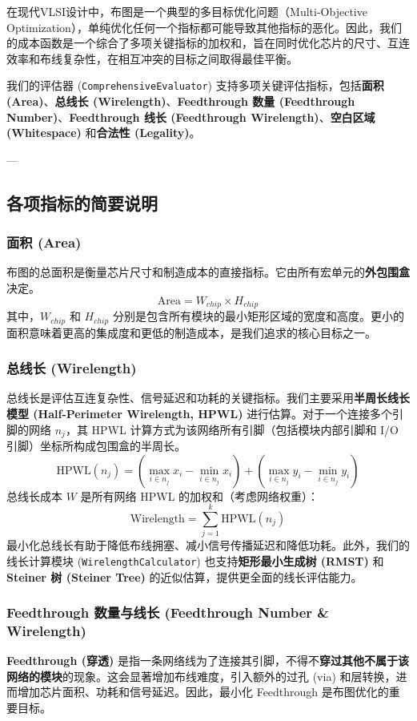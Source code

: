 \documentclass[conference]{IEEEtran}
\begin{document}
在现代VLSI设计中，布图是一个典型的多目标优化问题（Multi-Objective Optimization），单纯优化任何一个指标都可能导致其他指标的恶化。因此，我们的成本函数是一个综合了多项关键指标的加权和，旨在同时优化芯片的尺寸、互连效率和布线复杂性，在相互冲突的目标之间取得最佳平衡。

我们的评估器 (\texttt{ComprehensiveEvaluator}) 支持多项关键评估指标，包括\textbf{面积 (Area)}、\textbf{总线长 (Wirelength)}、\textbf{Feedthrough 数量 (Feedthrough Number)}、\textbf{Feedthrough 线长 (Feedthrough Wirelength)}、\textbf{空白区域 (Whitespace)} 和\textbf{合法性 (Legality)}。

---

\subsection{各项指标的简要说明}

\subsubsection{面积 (Area)}
布图的总面积是衡量芯片尺寸和制造成本的直接指标。它由所有宏单元的\textbf{外包围盒}决定。
$$ \text{Area} = W_{chip} \times H_{chip} $$
其中，$W_{chip}$ 和 $H_{chip}$ 分别是包含所有模块的最小矩形区域的宽度和高度。更小的面积意味着更高的集成度和更低的制造成本，是我们追求的核心目标之一。

\subsubsection{总线长 (Wirelength)}
总线长是评估互连复杂性、信号延迟和功耗的关键指标。我们主要采用\textbf{半周长线长模型 (Half-Perimeter Wirelength, HPWL)} \cite{B.A.-47}进行估算。对于一个连接多个引脚的网络 $n_j$，其 HPWL 计算方式为该网络所有引脚（包括模块内部引脚和 I/O 引脚）坐标所构成包围盒的半周长。
$$ \text{HPWL}(n_j) = (\max_{i \in n_j} x_i - \min_{i \in n_j} x_i) + (\max_{i \in n_j} y_i - \min_{i \in n_j} y_i) $$
总线长成本 $W$ 是所有网络 HPWL 的加权和（考虑网络权重）：
$$ \text{Wirelength} = \sum_{j=1}^{k} \text{HPWL}(n_j) $$
最小化总线长有助于降低布线拥塞、减小信号传播延迟和降低功耗。此外，我们的线长计算模块 (\texttt{WirelengthCalculator}) 也支持\textbf{矩形最小生成树 (RMST)}\cite{hwang1979n} 和\textbf{Steiner 树 (Steiner Tree)} \cite{J.I.-48}的近似估算，提供更全面的线长评估能力。

\subsubsection{Feedthrough 数量与线长 (Feedthrough Number \& Wirelength)}
\textbf{Feedthrough (穿透)} 是指一条网络线为了连接其引脚，不得不\textbf{穿过其他不属于该网络的模块}的现象。这会显著增加布线难度，引入额外的过孔 (via) 和层转换，进而增加芯片面积、功耗和信号延迟。因此，最小化 Feedthrough 是布图优化的重要目标。
\end{document}

